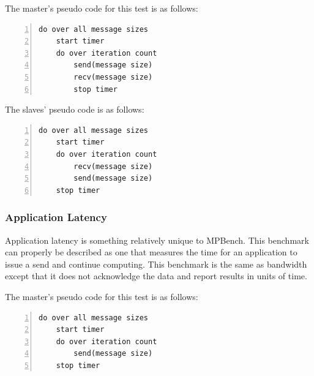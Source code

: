 The master's pseudo code for this test is as follows:

\begin{minipage}{\textwidth}
\end{minipage}

\begin{minipage}{\textwidth}
\begin{lstlisting}[frame=single,numbers=left]
  do over all message sizes 
    start timer
    do over iteration count
        send(message size)
        recv(message size) 
        stop timer
\end{lstlisting}
\end{minipage}

The slaves' pseudo code is as follows:

\begin{minipage}{\textwidth}
\end{minipage}

\begin{minipage}{\textwidth}
\begin{lstlisting}[frame=single,numbers=left]
do over all message sizes 
    start timer
    do over iteration count
        recv(message size)
        send(message size)
    stop timer
\end{lstlisting}
\end{minipage}

\subsubsection{Application Latency}

Application latency is something relatively unique to MPBench. This benchmark
can properly be described as one that measures the time for an application to
issue a send and continue computing. This benchmark is the same as bandwidth
except that it does not acknowledge the data and report results in units of
time.

The master's pseudo code for this test is as follows:

\begin{minipage}{\textwidth}
\end{minipage}

\begin{minipage}{\textwidth}
\begin{lstlisting}[frame=single,numbers=left]
do over all message sizes 
    start timer
    do over iteration count 
        send(message size) 
    stop timer
\end{lstlisting}    
\end{minipage}


